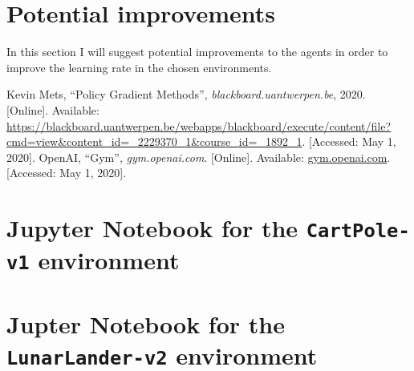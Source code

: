 \documentclass{article}
\begin{document}
 \section{Potential improvements}
  In this section I will suggest potential improvements to the agents in order
  to improve the learning rate in the chosen environments.




 \begin{thebibliography}{9}
   Kevin Mets, ``Policy Gradient Methods'', \textit{blackboard.uantwerpen.be}, 2020. [Online]. Available: \url{https://blackboard.uantwerpen.be/webapps/blackboard/execute/content/file?cmd=view&content_id=_2229370_1&course_id=_1892_1}. [Accessed: May 1, 2020].
   OpenAI, ``Gym'', \textit{gym.openai.com}. [Online]. Available: \url{gym.openai.com}. [Accessed: May 1, 2020].
 \end{thebibliography}


 \appendix

 \section{Jupyter Notebook for the \texttt{CartPole-v1} environment}
 \label{sec:cartpole-notebook}
 

 \section{Jupter Notebook for the \texttt{LunarLander-v2} environment}
 \label{sec:lunar-notebook}
 
\end{document}
